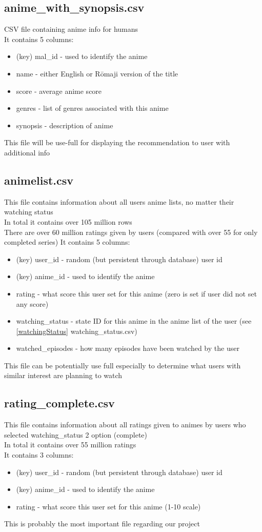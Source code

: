 \documentclass[12pt]{article}
\begin{document}
\subsection{anime\_with\_synopsis.csv}
CSV file containing anime info for humans \\ 
It contains 5 columns:
\begin{itemize}
    \item (key) mal\_id - used to identify the anime
    \item name - either English or R\=omaji version of the title 
    \item score - average anime score
    \item genres - list of genres associated with this anime
    \item synopsis - description of anime
\end{itemize}
This file will be use-full for displaying the recommendation to user with additional info
\subsection{animelist.csv}
This file contains information about all users anime lists, no matter their watching status \\ 
In total it contains over 105 million rows \\ 
There are over 60 million ratings given by users (compared with over 55 for only completed series)
It contains 5 columns:
\begin{itemize}
    \item (key) user\_id - random (but persistent through database) user id 
    \item (key) anime\_id - used to identify the anime 
    \item rating - what score this user set for this anime (zero is set if user did not set any score)
    \item watching\_status - state ID for this anime in the anime list of the user (see \ref{watchingStatus} watching\_status.csv)
    \item watched\_episodes - how many episodes have been watched by the user
\end{itemize}
This file can be potentially use full especially to determine what users with similar interest are planning to watch 
\subsection{rating\_complete.csv}
This file contains information about all ratings given to animes by users who selected watching\_status 2 option (complete) \\ 
In total it contains over 55 million ratings \\ 
It contains 3 columns:
\begin{itemize}
    \item (key) user\_id - random (but persistent through database) user id 
    \item (key) anime\_id - used to identify the anime 
    \item rating - what score this user set for this anime (1-10 scale)
\end{itemize}
This is probably the most important file regarding our project
\end{document}
